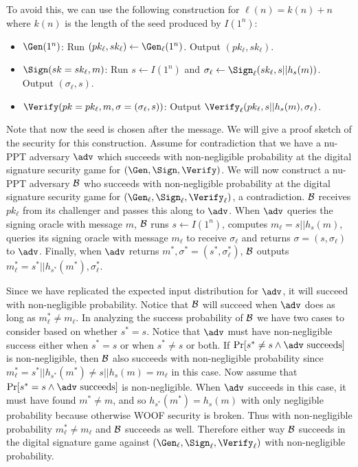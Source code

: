 To avoid this, we can use the following construction for $\ell(n) = k(n) + n$ where $k(n)$ is the length of the seed produced by $I(1^n)$: 
\begin{itemize}
    \item $\Gen(1^n)$: Run $(pk_\ell, sk_\ell) \leftarrow \Gen_\ell(1^n)$. Output $(pk_\ell,sk_\ell)$.

    \item $\Sign(sk=sk_\ell, m)$: Run $s \leftarrow I(1^n)$ and $\sigma_\ell \leftarrow \Sign_\ell(sk_\ell, s || h_s(m))$. Output $(\sigma_\ell, s)$. 

    \item $\Verify(pk=pk_\ell, m, \sigma = (\sigma_\ell, s))$: Output $\Verify_\ell(pk_\ell, s || h_s(m), \sigma_\ell)$. 
\end{itemize}
Note that now the seed is chosen after the message. 
We will give a proof sketch of the security for this construction. 
Assume for contradiction that we have a nu-PPT adversary $\adv$ which succeeds with non-negligible probability at the digital signature security game for $(\Gen, \Sign, \Verify)$. 
We will now construct a nu-PPT adversary $\mathcal{B}$ who succeeds with non-negligible probability at the digital signature security game for $(\Gen_\ell, \Sign_\ell, \Verify_\ell)$, a contradiction. 
$\mathcal{B}$ receives $pk_\ell$ from its challenger and passes this along to $\adv$. 
When $\adv$ queries the signing oracle with message $m$, $\mathcal{B}$ runs $s \leftarrow I(1^n)$, computes $m_{\ell} = s || h_{s}(m)$, queries its signing oracle with message $m_{\ell}$ to receive $\sigma_\ell$ and returns $\sigma = (s, \sigma_{\ell})$ to $\adv$. 
Finally, when $\adv$ returns $m^*, \sigma^* = (s^*, \sigma_{\ell}^*)$, $\mathcal{B}$ outputs $m^*_{\ell} = s^* || h_{s^*}(m^*), \sigma_{\ell}^*$. 

Since we have replicated the expected input distribution for $\adv$, it will succeed with non-negligible probability. 
Notice that $\mathcal{B}$ will succeed when $\adv$ does as long as $m^*_{\ell} \not = m_{\ell}$. 
In analyzing the success probability of $\mathcal{B}$ we have two cases to consider based on whether $s^* = s$. 
Notice that $\adv$ must have non-negligible success either when $s^* = s$ or when $s^* \not = s$ or both. 
If $\Pr[s^* \not = s \land \adv \text{ succeeds}]$ is non-negligible, then $\mathcal{B}$ also succeeds with non-negligible probability since $m^*_{\ell} = s^* || h_{s^*}(m^*) \not = s || h_{s}(m) = m_{\ell}$ in this case. 
Now assume that $\Pr[s^* = s \land \adv \text{ succeeds}]$ is non-negligible. When $\adv$ succeeds in this case, it must have found $m^* \not = m$, and so $h_{s^*}(m^*) = h_{s}(m)$ with only negligible probability because otherwise WOOF security is broken. 
Thus with non-negligible probability $m^*_{\ell} \not = m_{\ell}$ and $\mathcal{B}$ succeeds as well. 
Therefore either way $\mathcal{B}$ succeeds in the digital signature game against $(\Gen_\ell, \Sign_\ell, \Verify_\ell)$ with non-negligible probability. 

